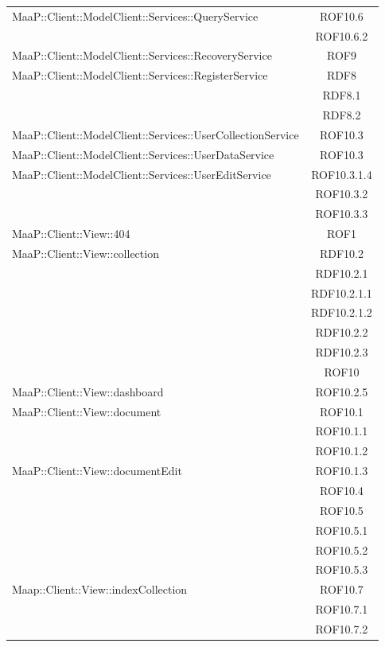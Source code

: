 \begin{center}
\begin{longtable}{|p{0.8\linewidth}|c|}
\midrule
MaaP::Client::ModelClient::Services::QueryService
& ROF10.6\\
& ROF10.6.2\\

\midrule
MaaP::Client::ModelClient::Services::RecoveryService
& ROF9\\

\midrule
MaaP::Client::ModelClient::Services::RegisterService
& RDF8\\
& RDF8.1\\
& RDF8.2\\

\midrule
MaaP::Client::ModelClient::Services::UserCollectionService
& ROF10.3\\

\midrule
MaaP::Client::ModelClient::Services::UserDataService
& ROF10.3\\

\midrule
MaaP::Client::ModelClient::Services::UserEditService
& ROF10.3.1.4\\
& ROF10.3.2\\
& ROF10.3.3\\

\midrule
MaaP::Client::View::404
& ROF1\\

\midrule
MaaP::Client::View::collection
& RDF10.2\\
& RDF10.2.1\\
& RDF10.2.1.1\\
& RDF10.2.1.2\\
& RDF10.2.2\\
& RDF10.2.3\\
& ROF10\\

\midrule
MaaP::Client::View::dashboard
& ROF10.2.5\\

\midrule
MaaP::Client::View::document
& ROF10.1\\
& ROF10.1.1\\
& ROF10.1.2\\

\midrule
MaaP::Client::View::documentEdit
& ROF10.1.3\\
& ROF10.4\\
& ROF10.5\\
& ROF10.5.1\\
& ROF10.5.2\\
& ROF10.5.3\\

\midrule
Maap::Client::View::indexCollection
& ROF10.7\\
& ROF10.7.1\\
& ROF10.7.2\\


\end{longtable}
\end{center}

